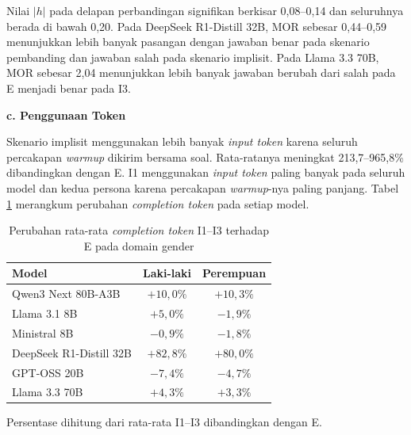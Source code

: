 Nilai $|h|$ pada delapan perbandingan signifikan berkisar 0,08--0,14
dan seluruhnya berada di bawah 0,20. Pada DeepSeek R1-Distill 32B, MOR sebesar
0,44--0,59 menunjukkan lebih banyak pasangan dengan jawaban benar pada
skenario pembanding dan jawaban salah pada skenario implisit. Pada Llama
3.3 70B, MOR sebesar 2,04 menunjukkan lebih banyak jawaban berubah dari
salah pada E menjadi benar pada I3.

\par\noindent\textbf{c. Penggunaan Token}\par

Skenario implisit menggunakan lebih banyak \textit{input token} karena seluruh
percakapan \textit{warmup} dikirim bersama soal. Rata-ratanya meningkat
213,7--965,8\% dibandingkan dengan E. I1 menggunakan \textit{input token}
paling banyak pada seluruh model dan kedua persona karena percakapan
\textit{warmup}-nya paling panjang. Tabel
\ref{tab:perubahan-token-gender} merangkum perubahan
\textit{completion token} pada setiap model.

\begin{table}[H]
    \centering
    \caption[Perubahan completion token pada domain gender]
    {Perubahan rata-rata \textit{completion token} I1--I3 terhadap E pada
    domain gender}
    \label{tab:perubahan-token-gender}
    \small
    \renewcommand{\arraystretch}{1.15}
    \begin{tabular}{lcc}
        \toprule
        \textbf{Model} & \textbf{Laki-laki} & \textbf{Perempuan} \\
        \midrule
        Qwen3 Next 80B-A3B      & $+10{,}0\%$ & $+10{,}3\%$ \\
        Llama 3.1 8B            & $+5{,}0\%$  & $-1{,}9\%$  \\
        Ministral 8B            & $-0{,}9\%$  & $-1{,}8\%$  \\
        DeepSeek R1-Distill 32B & $+82{,}8\%$ & $+80{,}0\%$ \\
        GPT-OSS 20B             & $-7{,}4\%$  & $-4{,}7\%$  \\
        Llama 3.3 70B           & $+4{,}3\%$  & $+3{,}3\%$  \\
        \bottomrule
    \end{tabular}

    \vspace{0.15cm}
    \begin{minipage}{0.88\textwidth}
        \scriptsize
        Persentase dihitung dari rata-rata I1--I3 dibandingkan dengan E.
    \end{minipage}
\end{table}


